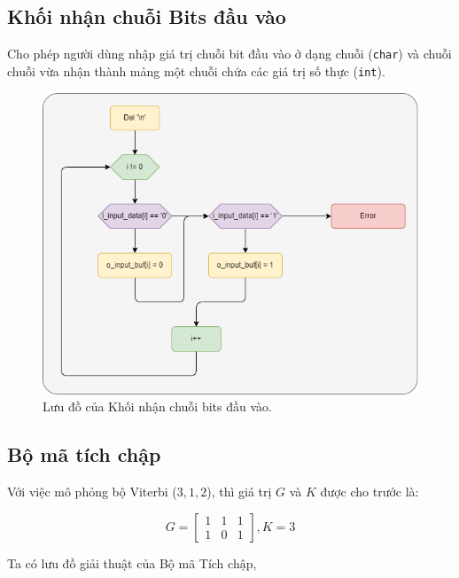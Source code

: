 \subsection{Khối nhận chuỗi Bits đầu vào}

Cho phép người dùng nhập giá trị chuỗi bit đầu vào ở dạng chuỗi (\texttt{char}) và chuỗi chuỗi vừa nhận thành mảng một chuỗi chứa các giá trị số thực (\texttt{int}).

\begin{figure}[H]
	\centering
	\includegraphics[width=.44\linewidth]{sections/pic/mophongbangC/Trans_string_to_binary.png}
	\caption{Lưu đồ của Khối nhận chuỗi bits đầu vào.}
\end{figure}


\subsection{Bộ mã tích chập}

Với việc mô phỏng bộ Viterbi ($3, 1, 2$), thì giá trị $G$ và $K$ được cho trước là:

\[
G = \begin{bmatrix}
	1 & 1 & 1\\
	1 & 0 & 1
\end{bmatrix}, K = 3
\]

Ta có lưu đồ giải thuật của Bộ mã Tích chập,

